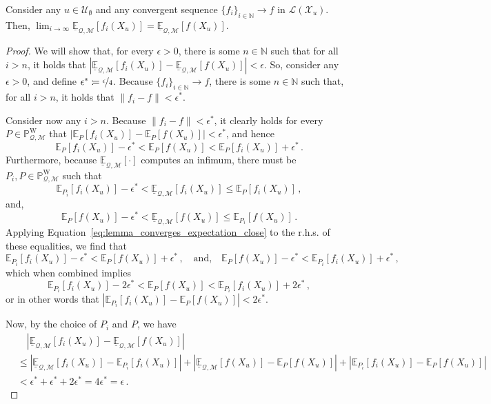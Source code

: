 \documentclass[twoside,11pt]{article}
\newcommand{\nats}{\mathbb{N}}
\newcommand{\states}{\mathcal{X}}
\newcommand{\processes}{\mathbb{P}}
\newcommand{\wprocesses}{\processes^{\mathrm{W}}}
\newcommand{\lexp}{\underline{\mathbb{E}}_{\rateset,\mathcal{M}}}
\newcommand{\gambles}{\mathcal{L}}
\newcommand{\rateset}{\mathcal{Q}}
\newcommand{\norm}[1]{\left\lVert #1 \right\rVert}
\newcommand{\abs}[1]{\left\vert #1 \right\vert}
\newcommand{\coloneqq}{:\!=}
\begin{document}
\begin{lemma}\label{lemma:limit_lexp_is_lexp_limit}
Consider any $u\in\mathcal{U}_\emptyset$ and any convergent sequence $\{f_i\}_{i\in\nats}\to f$ in $\gambles(\states_u)$. Then, $\lim_{i\to\infty}\lexp[f_i(X_u)]=\lexp[f(X_u)]$.
\end{lemma}
\begin{proof}
We will show that, for every $\epsilon>0$, there is some $n\in\nats$ such that for all $i>n$, it holds that $\abs{\lexp[f_i(X_u)]-\lexp[f(X_u)]} < \epsilon$. So, consider any $\epsilon>0$, and define $\epsilon^*\coloneqq \nicefrac{\epsilon}{4}$. Because $\{f_i\}_{i\in\nats}\to f$, there is some $n\in\nats$ such that, for all $i>n$, it holds that $\norm{f_i - f}<\epsilon^*$. 

Consider now any $i>n$. Because $\norm{f_i - f}<\epsilon^*$, it clearly holds for every $P\in\wprocesses_{\rateset,\mathcal{M}}$ that $\abs{\mathbb{E}_P[f_i(X_u)] - \mathbb{E}_P[f(X_u)]}<\epsilon^*$, and hence
\begin{equation}\label{eq:lemma_converges_expectation_close}
\mathbb{E}_P[f_i(X_u)] - \epsilon^* < \mathbb{E}_P[f(X_u)] < \mathbb{E}_P[f_i(X_u)] + \epsilon^*\,.
\end{equation}
Furthermore, because $\lexp[\cdot]$ computes an infimum, there must be $P_i,P\in\wprocesses_{\rateset,\mathcal{M}}$ such that
\begin{equation*}
\mathbb{E}_{P_i}[f_i(X_u)] - \epsilon^* < \lexp[f_i(X_u)] \leq \mathbb{E}_{P}[f_i(X_u)]\,,
\end{equation*}
and,
\begin{equation*}
\mathbb{E}_{P}[f(X_u)] - \epsilon^* < \lexp[f(X_u)] \leq \mathbb{E}_{P_i}[f(X_u)]\,.
\end{equation*}
Applying Equation~\eqref{eq:lemma_converges_expectation_close} to the r.h.s. of these equalities, we find that
\begin{equation*}
\mathbb{E}_{P_i}[f_i(X_u)] - \epsilon^* < \mathbb{E}_{P}[f(X_u)] + \epsilon^*\,,\quad\text{and,}\quad \mathbb{E}_{P}[f(X_u)] - \epsilon^* < \mathbb{E}_{P_i}[f_i(X_u)] + \epsilon^*\,,
\end{equation*}
which when combined implies
\begin{equation*}
\mathbb{E}_{P_i}[f_i(X_u)] - 2\epsilon^* < \mathbb{E}_{P}[f(X_u)] < \mathbb{E}_{P_i}[f_i(X_u)] + 2\epsilon^*\,,
\end{equation*}
or in other words that $\abs{\mathbb{E}_{P_i}[f_i(X_u)] - \mathbb{E}_{P}[f(X_u)]} < 2\epsilon^*$.

Now, by the choice of $P_i$ and $P$, we have
\begin{align*}
 &\quad \abs{\lexp[f_i(X_u)]-\lexp[f(X_u)]} \\
 &\leq \abs{\lexp[f_i(X_u)] - \mathbb{E}_{P_i}[f_i(X_u)]} + \abs{\lexp[f(X_u)] - \mathbb{E}_{P}[f(X_u)]} + \abs{\mathbb{E}_{P_i}[f_i(X_u)] - \mathbb{E}_{P}[f(X_u)]} \\
 &< \epsilon^* + \epsilon^* + 2\epsilon^* = 4\epsilon^* = \epsilon\,.
\end{align*}
\end{proof}
\end{document}
